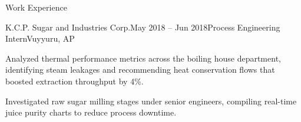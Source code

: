 \documentclass{resume} %
\begin{document}
\begin{rSection}{Work Experience}

\begin{rSubsection}{K.C.P. Sugar and Industries Corp.}{May 2018 -- Jun 2018}{Process Engineering Intern}{Vuyyuru, AP}
\item Analyzed thermal performance metrics across the boiling house department, identifying steam leakages and recommending heat conservation flows that boosted extraction throughput by 4\%.
\item Investigated raw sugar milling stages under senior engineers, compiling real-time juice purity charts to reduce process downtime.
\end{rSubsection}

\end{rSection}
\end{document}
